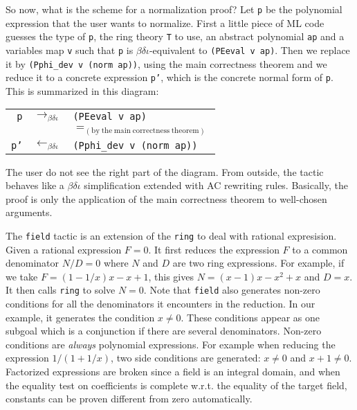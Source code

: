 So now, what is the scheme for a normalization proof? Let \texttt{p}
be the polynomial expression that the user wants to normalize. First a
little piece of ML code guesses the type of \texttt{p}, the ring
theory \texttt{T} to use, an abstract polynomial \texttt{ap} and a
variables map \texttt{v} such that \texttt{p} is
$\beta\delta\iota$-equivalent to \verb|(PEeval v ap)|. Then we
replace it by \verb|(Pphi_dev v (norm ap))|, using the
main correctness theorem and we reduce it to a concrete expression
\texttt{p'}, which is the concrete normal form of
\texttt{p}. This is summarized in this diagram:
\begin{center}
\begin{tabular}{rcl}
\texttt{p} & $\rightarrow_{\beta\delta\iota}$  
   & \texttt{(PEeval v ap)} \\
 & & $=_{\mathrm{(by\ the\ main\ correctness\ theorem)}}$ \\
\texttt{p'} 
   & $\leftarrow_{\beta\delta\iota}$ 
   & \texttt{(Pphi\_dev v (norm ap))}
\end{tabular}
\end{center}
The user do not see the right part of the diagram. 
From outside, the tactic behaves like a
$\beta\delta\iota$ simplification extended with AC rewriting rules.
Basically, the proof is only the application of the main
correctness theorem to well-chosen arguments.




The {\tt field} tactic is  an extension of the {\tt ring} to deal with
rational expresision. Given a rational expression $F=0$. It first reduces the expression $F$ to a common denominator $N/D= 0$ where $N$ and $D$ are two ring
expressions.
For example, if we take $F = (1 - 1/x) x - x + 1$, this gives 
$ N= (x -1)  x - x^2 + x$ and $D= x$. It then calls {\tt ring} 
to solve $N=0$. Note that {\tt field} also generates non-zero conditions
for all the denominators it encounters in the reduction.
In our example, it generates the condition $x \neq 0$. These
conditions appear as one subgoal which is a conjunction if there are
several denominators.
Non-zero conditions are {\it always} polynomial expressions. For example 
when reducing the expression $1/(1 + 1/x)$, two side conditions are
generated: $x\neq 0$ and $x + 1 \neq 0$. Factorized expressions are
broken since a field is an integral domain, and when the equality test
on coefficients is complete w.r.t. the equality of the target field,
constants can be proven different from zero automatically.

